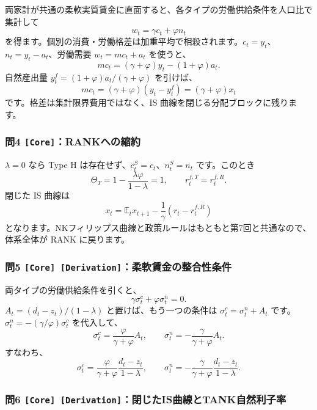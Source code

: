 \documentclass[
  japanese,
  lualatex,
  ja=standard,
  11pt,
  a4paper]{ltjsarticle}
\begin{document}
両家計が共通の柔軟実質賃金に直面すると、各タイプの労働供給条件を人口比で集計して
\[
w_t=\gamma c_t+\varphi n_t
\]
を得ます。個別の消費・労働格差は加重平均で相殺されます。\(c_t=y_t\)、\(n_t=y_t-a_t\)、労働需要
\(w_t=mc_t+a_t\) を使うと、 \[
mc_t=(\gamma+\varphi)y_t-(1+\varphi)a_t.
\] 自然産出量 \(y_t^f=(1+\varphi)a_t/(\gamma+\varphi)\) を引けば、 \[
mc_t=(\gamma+\varphi)(y_t-y_t^f)
=(\gamma+\varphi)x_t
\] です。格差は集計限界費用ではなく、IS
曲線を閉じる分配ブロックに残ります。

\subsubsection{\texorpdfstring{問4
\texttt{{[}Core{]}}：RANKへの縮約}{問4 {[}Core{]}：RANKへの縮約}}\label{ux554f4-corerankux3078ux306eux7e2eux7d04}

\(\lambda=0\) なら Type H は存在せず、\(c_t^S=c_t\)、\(n_t^S=n_t\)
です。このとき \[
\Theta_T=1-\frac{\lambda\varphi}{1-\lambda}=1,
\qquad
r_t^{f,T}=r_t^{f,R}.
\] 閉じた IS 曲線は \[
x_t=\mathbb E_tx_{t+1}-\frac1\gamma(r_t-r_t^{f,R})
\]
となります。NKフィリップス曲線と政策ルールはもともと第7回と共通なので、体系全体が
RANK に戻ります。

\subsubsection{\texorpdfstring{問5
\texttt{{[}Core{]}\ {[}Derivation{]}}：柔軟賃金の整合性条件}{問5 {[}Core{]} {[}Derivation{]}：柔軟賃金の整合性条件}}\label{ux554f5-core-derivationux67d4ux8edfux8cc3ux91d1ux306eux6574ux5408ux6027ux6761ux4ef6}

両タイプの労働供給条件を引くと、 \[
\gamma\sigma_t^c+\varphi\sigma_t^n=0.
\] \(A_t=(d_t-z_t)/(1-\lambda)\) と置けば、もう一つの条件は
\(\sigma_t^c=\sigma_t^n+A_t\)
です。\(\sigma_t^n=-(\gamma/\varphi)\sigma_t^c\) を代入して、 \[
\sigma_t^c=\frac{\varphi}{\gamma+\varphi}A_t,
\qquad
\sigma_t^n=-\frac{\gamma}{\gamma+\varphi}A_t.
\] すなわち、 \[
\sigma_t^c
=\frac{\varphi}{\gamma+\varphi}\frac{d_t-z_t}{1-\lambda},
\qquad
\sigma_t^n
=-\frac{\gamma}{\gamma+\varphi}\frac{d_t-z_t}{1-\lambda}.
\]

\subsubsection{\texorpdfstring{問6
\texttt{{[}Core{]}\ {[}Derivation{]}}：閉じたIS曲線とTANK自然利子率}{問6 {[}Core{]} {[}Derivation{]}：閉じたIS曲線とTANK自然利子率}}\label{ux554f6-core-derivationux9589ux3058ux305fisux66f2ux7ddaux3068tankux81eaux7136ux5229ux5b50ux7387}
\end{document}
